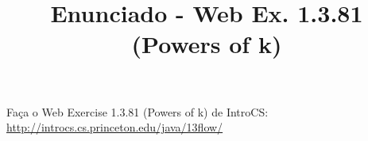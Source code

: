 \documentclass{article}
\title{Enunciado - Web Ex. 1.3.81 (Powers of k)}
\date{}
\author{}
\begin{document}
\maketitle

Fa\c{c}a o Web Exercise 1.3.81 (Powers of k) de IntroCS:
\bigbreak
\url{http://introcs.cs.princeton.edu/java/13flow/}
\end{document}
